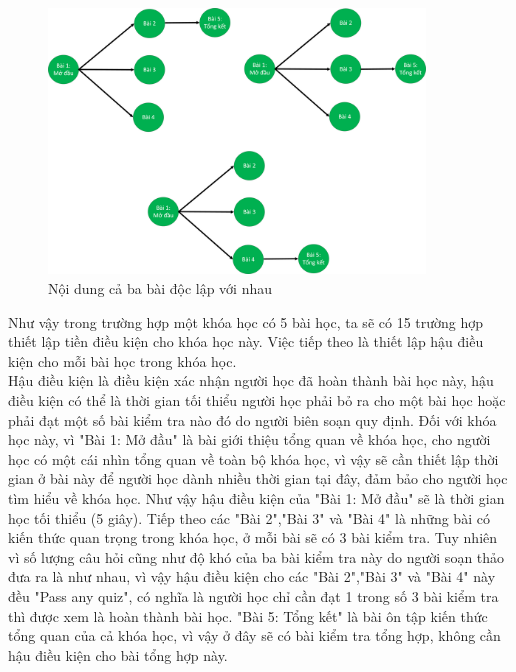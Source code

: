 \begin{center}
	\begin{figure}[htp]
		\begin{center}
			\includegraphics[width=10cm]{Chapter5/Pictures/picture57.png}
		\end{center}
		\caption{Nội dung cả ba bài độc lập với nhau}
		\label{refhinhchuong66}
	\end{figure}
\end{center}

\newpage

Như vậy trong trường hợp một khóa học có 5 bài học, ta sẽ có 15 trường hợp thiết lập tiền điều kiện cho khóa học này. Việc tiếp theo là thiết lập hậu điều kiện cho mỗi bài học trong khóa học.\\

Hậu điều kiện là điều kiện xác nhận người học đã hoàn thành bài học này, hậu điều kiện có thể là thời gian tối thiểu người học phải bỏ ra cho một bài học hoặc phải đạt một số bài kiểm tra nào đó do người biên soạn quy định. Đối với khóa học này, vì "Bài 1: Mở đầu" là bài giới thiệu tổng quan về khóa học, cho người học có một cái nhìn tổng quan về toàn bộ khóa học, vì vậy sẽ cần thiết lập thời gian ở bài này để người học dành nhiều thời gian tại đây, đảm bảo cho người học tìm hiểu về khóa học. Như vậy hậu điều kiện của "Bài 1: Mở đầu" sẽ là thời gian học tối thiểu (5 giây). Tiếp theo các "Bài 2","Bài 3" và "Bài 4" là những bài có kiến thức quan trọng trong khóa học, ở mỗi bài sẽ có 3 bài kiểm tra. Tuy nhiên vì số lượng câu hỏi cũng như độ khó của ba bài kiểm tra này do người soạn thảo đưa ra là như nhau, vì vậy hậu điều kiện cho các "Bài 2","Bài 3" và "Bài 4" này đều "Pass any quiz", có nghĩa là người học chỉ cần đạt 1 trong số 3 bài kiểm tra thì được xem là hoàn thành bài học. "Bài 5: Tổng kết" là bài ôn tập kiến thức tổng quan của cả khóa học, vì vậy ở đây sẽ có bài kiểm tra tổng hợp, không cần hậu điều kiện cho bài tổng hợp này.\\


